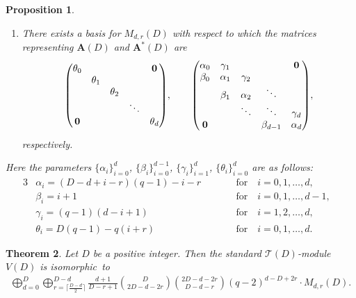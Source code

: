 \documentclass[10pt,a4paper]{amsart}
\def\A{\mathbf A}
\def\T{\mathcal T}
\numberwithin{equation}{section}
\newtheorem{Theorem}{Theorem}[section]
\newtheorem{Proposition}[Theorem]{Proposition}
 { \theoremstyle{definition}
\newtheorem{Definition}[Theorem]{Definition}
\newtheorem{Note}[Theorem]{Note}
\newtheorem{Example}[Theorem]{Example}
\newtheorem{Remark}[Theorem]{Remark} }
\begin{document}
\begin{Proposition}
\begin{enumerate}
\item[$(ii)$] There exists a basis for $M_{d,r}(D)$ with respect to which the matrices representing $\A(D)$ and $\A^*(D)$ are
\begin{gather*}
\begin{pmatrix}
\theta_0 & & & &{\bf 0}
\\
 &\theta_1
\\
 & &\theta_2
 \\
 & & &\ddots
 \\
{\bf 0} & & & &\theta_d
\end{pmatrix}\!,
\qquad
\begin{pmatrix}
\alpha_0 &\gamma_1 & & &{\bf 0}
\\
\beta_0 &\alpha_1 &\gamma_2
\\
&\beta_1 &\alpha_2 &\ddots
 \\
& &\ddots &\ddots &\gamma_d
 \\
{\bf 0} & & &\beta_{d-1} &\alpha_d
\end{pmatrix}\!,
\end{gather*}
respectively.
\end{enumerate}
Here the parameters $\{\alpha_i\}_{i=0}^d$,
$\{\beta_i\}_{i=0}^{d-1}$, $\{\gamma_i\}_{i=1}^d$, $\{\theta_i\}_{i=0}^d$ are as follows:
\begin{alignat*}{3}
&\alpha_i=(D-d+i-r)(q-1)-i-r\qquad
&&\text{for}\quad i=0,1,\dots,d,&
\\
&\beta_i=i+1\qquad
&&\text{for}\quad i=0,1,\dots,d-1,&
\\
&\gamma_i=(q-1)(d-i+1)\qquad
&&\text{for}\quad i=1,2,\dots,d,&
\\
&\theta_i=D(q-1)-q(i+r)\qquad
&&\text{for}\quad i=0,1,\dots,d.&
\end{alignat*}
\end{Proposition}

\begin{Theorem}\label{thm2:dec_T(D)module}
Let $D$ be a positive integer. Then the standard $\T(D)$-module $V(D)$ is isomorphic~to
\begin{gather*}
\bigoplus_{d=0}^D
\bigoplus_{r=\lceil \frac{D-d}{2}\rceil}^{D-d}
\frac{d+1}{D-r+1}{D\choose 2D-d-2r}{2D-d-2r\choose D-d-r}
(q-2)^{d-D+2r}\cdot M_{d,r}(D).
\end{gather*}
\end{Theorem}
\end{document}
